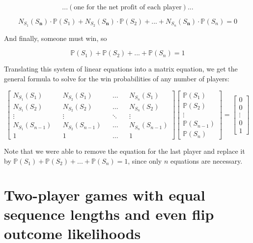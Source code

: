 \documentclass[english,12pt,a4paper,final]{article}
\begin{document}
\begin{equation*}
	...(\text{one for the net profit of each player})...
\end{equation*}

\begin{equation*}
	N_{S_1}(S_\textbf{n}) \cdot \mathbb{P}(S_1) + N_{S_2}(S_\textbf{n}) \cdot \mathbb{P}(S_2) + ... + N_{S_n}(S_\textbf{n}) \cdot \mathbb{P}(S_n) = 0
\end{equation*}

And finally, someone must win, so 

\begin{equation*}
	\mathbb{P}(S_1) + \mathbb{P}(S_2) + ... + \mathbb{P}(S_n) = 1
\end{equation*}

Translating this system of linear equations into a matrix equation, we get the general formula to solve for the win probabilities of any number of players:

\begin{equation}\label{generalFormula}
	\begin{bmatrix}
		N_{S_1}(S_1) && N_{S_2}(S_1) && \dots && N_{S_n}(S_1) \\
		N_{S_1}(S_2) && N_{S_2}(S_2) && \dots && N_{S_n}(S_2) \\
		\vdots && \vdots && \ddots && \vdots \\
		N_{S_1}(S_{n-1}) && N_{S_2}(S_{n-1}) && \dots && N_{S_n}(S_{n-1}) \\
		1 && 1 && \dots && 1
	\end{bmatrix}
	\begin{bmatrix}
		\mathbb{P}(S_1) \\ \mathbb{P}(S_2) \\ \vdots \\ \mathbb{P}(S_{n-1}) \\  \mathbb{P}(S_n)
	\end{bmatrix}
	=
	\begin{bmatrix}
		0 \\ 0 \\ \vdots \\ 0 \\ 1
	\end{bmatrix}
\end{equation}

Note that we were able to remove the equation for the last player and replace it by $\mathbb{P}(S_1) + \mathbb{P}(S_2) + ... + \mathbb{P}(S_n) = 1$, since only $n$ equations are necessary.

\part{Two-player games with equal sequence lengths and even flip outcome likelihoods}\label{twoPlayerProofs}
\end{document}
